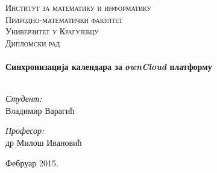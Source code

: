 %
%

\begin{titlepage}

\begin{center}


\textsc{\LARGE Институт за математику и информатику
\\ Природно-математички факултет
\\ Универзитет у Крагујевцу}\\[1.5cm]

\textsc{\Large Дипломски рад}\\[0.5cm]

\HRule \\[0.4cm]
{ \huge \bfseries Синхронизација календара за \textit{оwnCloud} платформу}\\[0.4cm]

\HRule \\[1.5cm]

\begin{minipage}{0.4\textwidth}
\begin{flushleft} \large
\emph{Студент:}\\
Владимир Варагић
\end{flushleft}
\end{minipage}
\begin{minipage}{0.4\textwidth}
\begin{flushright} \large
\emph{Професор:} \\
др Милош Ивановић
\end{flushright}
\end{minipage}

\vfill

{\large Фебруар 2015.}

\end{center}

\end{titlepage}
